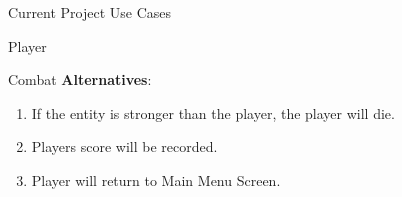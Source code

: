 \documentclass[12pt]{report}
\begin{document}
\begin{chapter}{Current Project Use Cases}
\begin{section}{Player}
\begin{subsection}{Combat}
      \textbf{Alternatives}:
      \begin{enumerate}
        \item If the entity is stronger than the player, the player will die.
        \item Players score will be recorded.
        \item Player will return to Main Menu Screen.
      \end{enumerate}
     \end{subsection}
    \end{section}
  \end{chapter}
\end{document}
